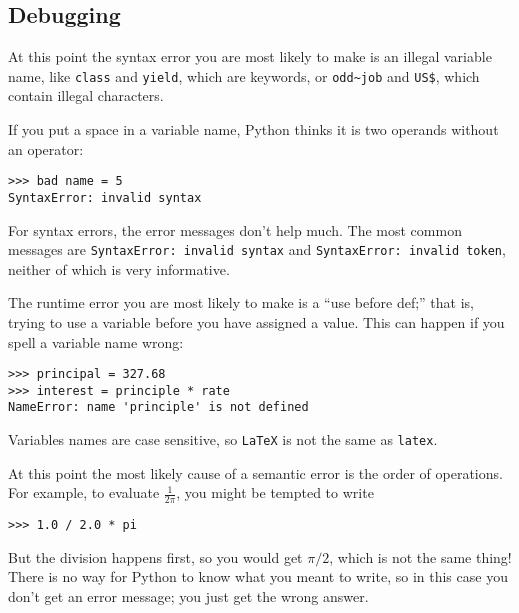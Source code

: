 \begin{ex}
\section{Debugging}

At this point the syntax error you are most likely to make is
an illegal variable name, like {\tt class} and {\tt yield}, which
are keywords, or \verb"odd~job" and \verb"US$", which contain
illegal characters.


If you put a space in a variable name, Python thinks it is two
operands without an operator:

\beforeverb
\begin{verbatim}
>>> bad name = 5
SyntaxError: invalid syntax
\end{verbatim}
\afterverb
%
For syntax errors, the error messages don't help much.
The most common messages are {\tt SyntaxError: invalid syntax} and
{\tt SyntaxError: invalid token}, neither of which is very informative.


The runtime error you are most likely to make is a ``use before
def;'' that is, trying to use a variable before you have assigned
a value.  This can happen if you spell a variable name wrong:

\beforeverb
\begin{verbatim}
>>> principal = 327.68
>>> interest = principle * rate
NameError: name 'principle' is not defined
\end{verbatim}
\afterverb
%
Variables names are case sensitive, so {\tt LaTeX} is not the
same as {\tt latex}.


At this point the most likely cause of a semantic error is
the order of operations.  For example, to evaluate $\frac{1}{2 \pi}$,
you might be tempted to write

\beforeverb
\begin{verbatim}
>>> 1.0 / 2.0 * pi
\end{verbatim}
\afterverb
%
But the division happens first, so you would get $\pi / 2$, which
is not the same thing!  There is no way for Python
to know what you meant to write, so in this case you don't
get an error message; you just get the wrong answer.



\end{ex}
